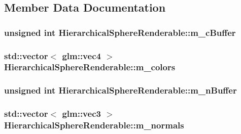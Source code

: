 \subsection{Member Data Documentation}
\hypertarget{classHierarchicalSphereRenderable_ae563ee9c7597aeaf5c00cc430626bdf6}{
\subsubsection[{m\+\_\+c\+Buffer}]{\setlength{\rightskip}{0pt plus 5cm}unsigned int Hierarchical\+Sphere\+Renderable\+::m\+\_\+c\+Buffer\hspace{0.3cm}{\ttfamily [private]}}}\label{classHierarchicalSphereRenderable_ae563ee9c7597aeaf5c00cc430626bdf6}
\hypertarget{classHierarchicalSphereRenderable_a8875eaeab3e4381ab00de2cfb8f650ba}{
\subsubsection[{m\+\_\+colors}]{\setlength{\rightskip}{0pt plus 5cm}std\+::vector$<$ glm\+::vec4 $>$ Hierarchical\+Sphere\+Renderable\+::m\+\_\+colors\hspace{0.3cm}{\ttfamily [private]}}}\label{classHierarchicalSphereRenderable_a8875eaeab3e4381ab00de2cfb8f650ba}
\hypertarget{classHierarchicalSphereRenderable_a3d0052db7a742c21b4b88933ba073fb3}{
\subsubsection[{m\+\_\+n\+Buffer}]{\setlength{\rightskip}{0pt plus 5cm}unsigned int Hierarchical\+Sphere\+Renderable\+::m\+\_\+n\+Buffer\hspace{0.3cm}{\ttfamily [private]}}}\label{classHierarchicalSphereRenderable_a3d0052db7a742c21b4b88933ba073fb3}
\hypertarget{classHierarchicalSphereRenderable_a61da071fdee1bd9c74f4a56e8264b90c}{
\subsubsection[{m\+\_\+normals}]{\setlength{\rightskip}{0pt plus 5cm}std\+::vector$<$ glm\+::vec3 $>$ Hierarchical\+Sphere\+Renderable\+::m\+\_\+normals\hspace{0.3cm}{\ttfamily [private]}}}\label{classHierarchicalSphereRenderable_a61da071fdee1bd9c74f4a56e8264b90c}
